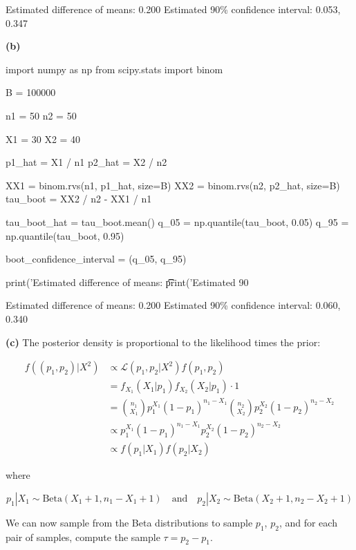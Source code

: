 \begin{console}
Estimated difference of means:           0.200
Estimated 90\% confidence interval:       0.053, 0.347
\end{console}

\textbf{(b)}

\begin{python}
import numpy as np
from scipy.stats import binom

B = 100000

n1 = 50
n2 = 50

X1 = 30
X2 = 40

p1_hat = X1 / n1
p2_hat = X2 / n2

XX1 = binom.rvs(n1, p1_hat, size=B)
XX2 = binom.rvs(n2, p2_hat, size=B)
tau_boot = XX2 / n2 - XX1 / n1

tau_boot_hat = tau_boot.mean()
q_05 = np.quantile(tau_boot, 0.05)
q_95 = np.quantile(tau_boot, 0.95)

boot_confidence_interval = (q_05, q_95)

print('Estimated difference of means: \t\t %
print('Estimated 90%
\end{python}

\begin{console}
Estimated difference of means:           0.200
Estimated 90\% confidence interval:       0.060, 0.340
\end{console}

\textbf{(c)} The posterior density is proportional to the likelihood
times the prior:

\begin{align}
f((p_1, p_2) | X^2) &\propto \mathcal{L}(p_1, p_2 | X^2) f(p_1, p_2) \\
&= f_{X_1}(X_1 | p_1) f_{X_2}(X_2 | p_1) \cdot 1 \\
&= \binom{n_1}{X_1} p_1^{X_1} (1 - p_1)^{n_1 - X_1} \binom{n_2}{X_2} p_2^{X_2} (1 - p_2)^{n_2 - X_2} \\
&\propto p_1^{X_1} (1 - p_1)^{n_1 - X_1} p_2^{X_2} (1 - p_2)^{n_2 - X_2} \\
&\propto f(p_1 | X_1) f(p_2 | X_2)
\end{align}

where

\[p_1 | X_1 \sim \text{Beta}(X_1 + 1, n_1 - X_1 + 1) 
\quad \text{and} \quad
p_2 | X_2 \sim \text{Beta}(X_2 + 1, n_2 - X_2 + 1)\]

We can now sample from the Beta distributions to sample \(p_1\),
\(p_2\), and for each pair of samples, compute the sample
\(\tau = p_2 - p_1\).

